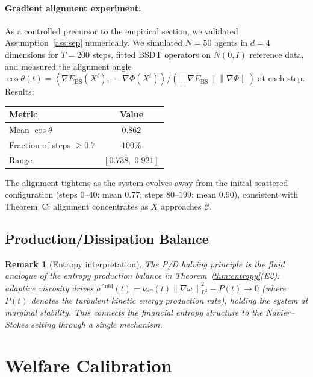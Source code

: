 \documentclass[11pt]{article}
\newtheorem{remark}[theorem]{Remark}
\theoremstyle{definition}
\newcommand{\grad}{\nabla}
\newcommand{\Ebs}{E_{\mathrm{BS}}}
\newcommand{\Cman}{\mathcal{C}}
\newcommand{\norm}[1]{\left\|#1\right\|}
\newcommand{\inner}[2]{\left\langle #1,\, #2\right\rangle}
\newcommand{\costheta}{\cos\theta}
\begin{document}
\paragraph{Gradient alignment experiment.}
As a controlled precursor to the empirical section, we validated Assumption~\ref{ass:sep}
numerically.  We simulated $N=50$ agents in $d=4$ dimensions for $T=200$ steps,
fitted BSDT operators on $N(0,I)$ reference data, and measured the alignment angle
$\costheta(t) = \inner{\grad\Ebs(X^t)}{-\grad\Phi(X^t)}/
(\norm{\grad\Ebs}\norm{\grad\Phi})$ at each step.  Results:
\begin{center}
\begin{tabular}{lc}
\toprule
Metric & Value \\
\midrule
Mean $\costheta$ & $0.862$ \\
Fraction of steps $\ge 0.7$ & $100\%$ \\
Range & $[0.738,\; 0.921]$ \\
\bottomrule
\end{tabular}
\end{center}
The alignment tightens as the system evolves away from the initial scattered
configuration (steps $0$--$40$: mean $0.77$; steps $80$--$199$: mean $0.90$),
consistent with Theorem~C: alignment concentrates as $X$ approaches $\Cman$.

\subsection{Production/Dissipation Balance}
\label{sec:pd}


\begin{remark}[Entropy interpretation]
\label{rem:entropy_pd}
The P/D halving principle is the fluid analogue of the entropy production
balance in Theorem~\ref{thm:entropy}(E2): adaptive viscosity drives
$\sigma^{\mathrm{fluid}}(t)
  = \nu_{\mathrm{eff}}(t)\norm{\nabla\omega}^2_{L^2} - P(t) \to 0$
(where $P(t)$ denotes the turbulent kinetic energy production rate),
holding the system at marginal stability.  This connects the financial
entropy structure to the Navier--Stokes setting through a single mechanism.
\end{remark}

\section{Welfare Calibration}
\label{sec:welfare}
\end{document}
